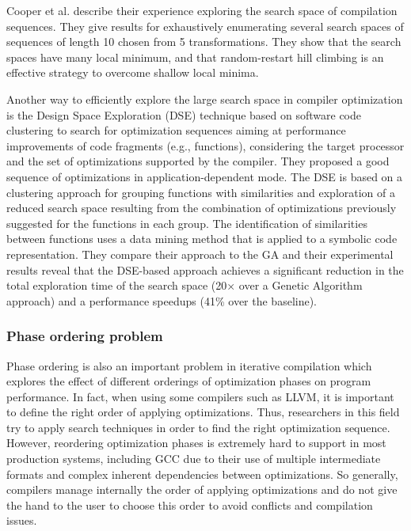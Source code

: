 Cooper et al.\cite{cooper2006exploring} describe their experience exploring the search space of compilation sequences. They give results for exhaustively enumerating several search spaces of sequences of length 10 chosen from 5 transformations. They show that the search spaces have many local minimum, and that random-restart hill climbing is an effective strategy to overcome shallow local minima.


Another way to efficiently explore the large search space in compiler optimization is the Design Space Exploration (DSE) technique based on software code clustering to search for optimization sequences aiming at performance improvements of code fragments (e.g., functions), considering the target processor and the set of optimizations supported by the compiler\cite{martins2014exploration,martins2016clustering}. They proposed a good sequence of optimizations in application-dependent mode. The DSE is based on a clustering approach for grouping functions with similarities
and exploration of a reduced search space resulting from the combination of optimizations previously suggested for the functions in each group.
The identification of similarities between functions uses a data mining method that is applied to a symbolic code representation.
They compare their approach to the GA and their experimental results reveal that the DSE-based approach achieves a significant reduction in the total exploration time of the search space (20× over a Genetic Algorithm approach) and a performance speedups (41\% over the baseline). 




\subsubsection{Phase ordering problem}
Phase ordering is also an important problem in iterative compilation which explores the effect of different orderings of optimization phases on program performance. In fact, when using some compilers such as LLVM, it is important to define the right order of applying optimizations. Thus, researchers in this field try to apply search techniques in order to find the right optimization sequence. However, reordering optimization phases is extremely hard to support in most production systems, including GCC due to their use of multiple intermediate formats and complex inherent dependencies between optimizations. So generally, compilers manage internally the order of applying optimizations and do not give the hand to the user to choose this order to avoid conflicts and compilation issues.

